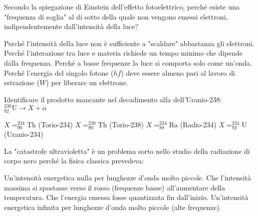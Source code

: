 \documentclass{exam}%
\begin{document}
\begin{questions}
\question Secondo la spiegazione di Einstein dell'effetto fotoelettrico, perché esiste una "frequenza di soglia" al di sotto della quale non vengono emessi elettroni, indipendentemente dall'intensità della luce?%
\vspace{0.2em}%
\begin{choices}%
\choice Perché l'intensità della luce non è sufficiente a "scaldare" abbastanza gli elettroni.%
\choice Perché l'interazione tra luce e materia richiede un tempo minimo che dipende dalla frequenza.%
\choice Perché a basse frequenze la luce si comporta solo come un'onda.%
\choice Perché l'energia del singolo fotone ($hf$) deve essere almeno pari al lavoro di estrazione ($W$) per liberare un elettrone.%
\end{choices}%
\question Identificare il prodotto mancante nel decadimento alfa dell'Uranio-238: $^{238}_{92}\text{U} \rightarrow X + \alpha$%
\vspace{0.2em}%
\begin{multicols}{4}%
\begin{choices}%
\choice $X = ^{234}_{90}\text{Th}$ (Torio-234)%
\choice $X = ^{238}_{90}\text{Th}$ (Torio-238)%
\choice $X = ^{234}_{88}\text{Ra}$ (Radio-234)%
\choice $X = ^{234}_{92}\text{U}$ (Uranio-234)%
\end{choices}%
\end{multicols}%
\question La "catastrofe ultravioletta" è un problema sorto nello studio della radiazione di corpo nero perché la fisica classica prevedeva:%
\vspace{0.2em}%
\begin{choices}%
\choice Un'intensità energetica nulla per lunghezze d'onda molto piccole.%
\choice Che l'intensità massima si spostasse verso il rosso (frequenze basse) all'aumentare della temperatura.%
\choice Che l'energia emessa fosse quantizzata fin dall'inizio.%
\choice Un'intensità energetica infinita per lunghezze d'onda molto piccole (alte frequenze).%
\end{choices}%
\end{questions}%
\end{document}
